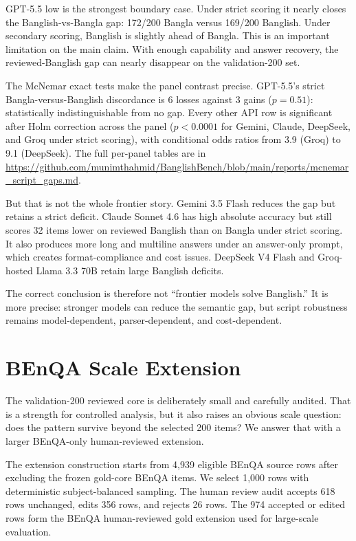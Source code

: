 GPT-5.5 low is the strongest boundary case. Under strict scoring it nearly closes the Banglish-vs-Bangla gap: 172/200 Bangla versus 169/200 Banglish. Under secondary scoring, Banglish is slightly ahead of Bangla. This is an important limitation on the main claim. With enough capability and answer recovery, the reviewed-Banglish gap can nearly disappear on the validation-200 set.

The McNemar exact tests make the panel contrast precise. GPT-5.5's strict Bangla-versus-Banglish discordance is 6 losses against 3 gains ($p = 0.51$): statistically indistinguishable from no gap. Every other API row is significant after Holm correction across the panel ($p < 0.0001$ for Gemini, Claude, DeepSeek, and Groq under strict scoring), with conditional odds ratios from 3.9 (Groq) to 9.1 (DeepSeek). The full per-panel tables are in \url{https://github.com/munimthahmid/BanglishBench/blob/main/reports/mcnemar_script_gaps.md}.

But that is not the whole frontier story. Gemini 3.5 Flash reduces the gap but retains a strict deficit. Claude Sonnet 4.6 has high absolute accuracy but still scores 32 items lower on reviewed Banglish than on Bangla under strict scoring. It also produces more long and multiline answers under an answer-only prompt, which creates format-compliance and cost issues. DeepSeek V4 Flash and Groq-hosted Llama 3.3 70B retain large Banglish deficits.

The correct conclusion is therefore not ``frontier models solve Banglish.'' It is more precise: stronger models can reduce the semantic gap, but script robustness remains model-dependent, parser-dependent, and cost-dependent.

\section{BEnQA Scale Extension}

The validation-200 reviewed core is deliberately small and carefully audited. That is a strength for controlled analysis, but it also raises an obvious scale question: does the pattern survive beyond the selected 200 items? We answer that with a larger BEnQA-only human-reviewed extension.

The extension construction starts from 4,939 eligible BEnQA source rows after excluding the frozen gold-core BEnQA items. We select 1,000 rows with deterministic subject-balanced sampling. The human review audit accepts 618 rows unchanged, edits 356 rows, and rejects 26 rows. The 974 accepted or edited rows form the BEnQA human-reviewed gold extension used for large-scale evaluation.


